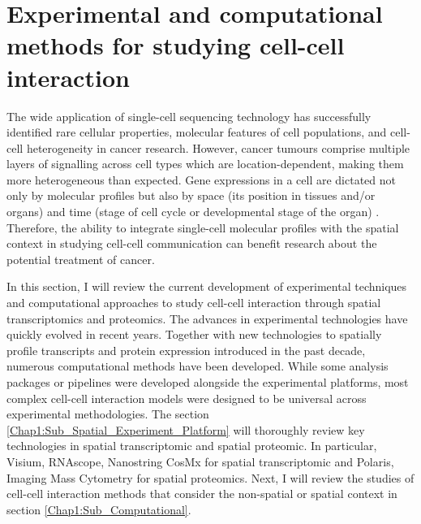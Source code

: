 \section{Experimental and computational methods for studying cell-cell interaction}
\label{section:lit_review}
The wide application of single-cell sequencing technology has successfully identified rare cellular properties, molecular features of cell populations, and cell-cell heterogeneity in cancer research. However, cancer tumours comprise multiple layers of signalling across cell types which are location-dependent, making them more heterogeneous than expected. Gene expressions in a cell are dictated not only by molecular profiles but also by space (\ie its position in tissues and/or organs) and time (\ie stage of cell cycle or developmental stage of the organ) \cite{salomon2020genomic}. Therefore, the ability to integrate single-cell molecular profiles with the spatial context in studying cell-cell communication can benefit research about the potential treatment of cancer.

In this section, I will review the current development of experimental techniques and computational approaches to study cell-cell interaction through spatial transcriptomics and proteomics. The advances in experimental technologies have quickly evolved in recent years. Together with new technologies to spatially profile transcripts and protein expression introduced in the past decade, numerous computational methods have been developed. While some analysis packages or pipelines were developed alongside the experimental platforms, most complex cell-cell interaction models were designed to be universal across experimental methodologies. The section \ref{Chap1:Sub_Spatial_Experiment_Platform} will thoroughly review key technologies in spatial transcriptomic and spatial proteomic. In particular, Visium, RNAscope, Nanostring CosMx for spatial transcriptomic and Polaris, Imaging Mass Cytometry for spatial proteomics. Next, I will review the studies of cell-cell interaction methods that consider the non-spatial or spatial context in section \ref{Chap1:Sub_Computational}.          

